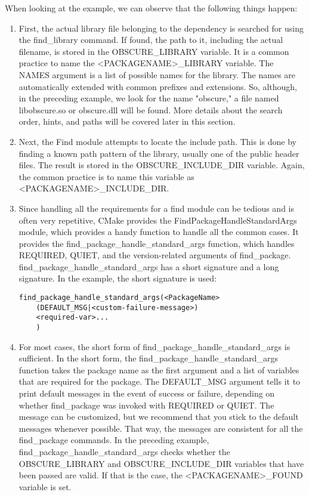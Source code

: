 When looking at the example, we can observe that the following things happen:

\begin{enumerate}
\item 
First, the actual library file belonging to the dependency is searched for using the find\_library command. If found, the path to it, including the actual filename, is stored in the OBSCURE\_LIBRARY variable. It is a common practice to name the <PACKAGENAME>\_LIBRARY variable. The NAMES argument is a list of possible names for the library. The names are automatically extended with common prefixes and extensions. So, although, in the preceding example, we look for the name "obscure," a file named libobscure.so or obscure.dll will be found. More details about the search order, hints, and paths will be covered later in this section.

\item 
Next, the Find module attempts to locate the include path. This is done by finding a known path pattern of the library, usually one of the public header files. The result is stored in the OBSCURE\_INCLUDE\_DIR variable. Again, the common practice is to name this variable as <PACKAGENAME>\_INCLUDE\_DIR.

\item 
Since handling all the requirements for a find module can be tedious and is often very repetitive, CMake provides the FindPackageHandleStandardArgs module, which provides a handy function to handle all the common cases. It provides the find\_package\_handle\_standard\_args function, which handles REQUIRED, QUIET, and the version-related arguments of find\_package. find\_package\_handle\_standard\_args has a short signature and a long signature. In the example, the short signature is used:

\begin{lstlisting}[style=styleCMake]
find_package_handle_standard_args(<PackageName>
	(DEFAULT_MSG|<custom-failure-message>)
	<required-var>...
	)
\end{lstlisting}

\item 
For most cases, the short form of find\_package\_handle\_standard\_args is sufficient. In the short form, the find\_package\_handle\_standard\_args function takes the package name as the first argument and a list of variables that are required for the package. The DEFAULT\_MSG argument tells it to print default messages in the event of success or failure, depending on whether find\_package was invoked with REQUIRED or QUIET. The message can be customized, but we recommend that you stick to the default messages whenever possible. That way, the messages are consistent for all the find\_package commands. In the preceding example, find\_package\_handle\_standard\_args checks whether the OBSCURE\_LIBRARY and OBSCURE\_INCLUDE\_DIR variables that have been passed are valid. If that is the case, the <PACKAGENAME>\_FOUND variable is set.


\end{enumerate}
